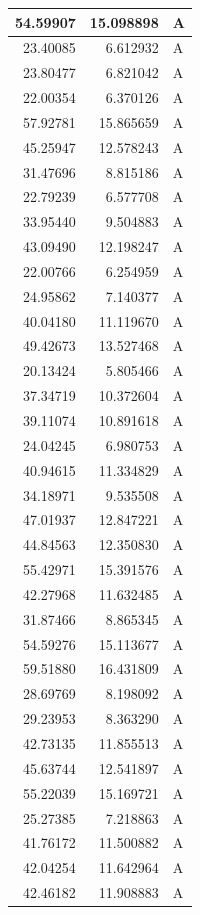 \documentclass[
  letterpaper,
  DIV=11,
  numbers=noendperiod]{scrartcl}
\begin{document}
\begin{table}
\begin{tabular}[t]{r|r|l}
\hline
54.59907 & 15.098898 & A\\
\hline
23.40085 & 6.612932 & A\\
\hline
23.80477 & 6.821042 & A\\
\hline
22.00354 & 6.370126 & A\\
\hline
57.92781 & 15.865659 & A\\
\hline
45.25947 & 12.578243 & A\\
\hline
31.47696 & 8.815186 & A\\
\hline
22.79239 & 6.577708 & A\\
\hline
33.95440 & 9.504883 & A\\
\hline
43.09490 & 12.198247 & A\\
\hline
22.00766 & 6.254959 & A\\
\hline
24.95862 & 7.140377 & A\\
\hline
40.04180 & 11.119670 & A\\
\hline
49.42673 & 13.527468 & A\\
\hline
20.13424 & 5.805466 & A\\
\hline
37.34719 & 10.372604 & A\\
\hline
39.11074 & 10.891618 & A\\
\hline
24.04245 & 6.980753 & A\\
\hline
40.94615 & 11.334829 & A\\
\hline
34.18971 & 9.535508 & A\\
\hline
47.01937 & 12.847221 & A\\
\hline
44.84563 & 12.350830 & A\\
\hline
55.42971 & 15.391576 & A\\
\hline
42.27968 & 11.632485 & A\\
\hline
31.87466 & 8.865345 & A\\
\hline
54.59276 & 15.113677 & A\\
\hline
59.51880 & 16.431809 & A\\
\hline
28.69769 & 8.198092 & A\\
\hline
29.23953 & 8.363290 & A\\
\hline
42.73135 & 11.855513 & A\\
\hline
45.63744 & 12.541897 & A\\
\hline
55.22039 & 15.169721 & A\\
\hline
25.27385 & 7.218863 & A\\
\hline
41.76172 & 11.500882 & A\\
\hline
42.04254 & 11.642964 & A\\
\hline
42.46182 & 11.908883 & A\\

\end{tabular}
\end{table}
\end{document}

